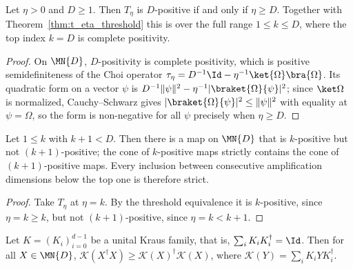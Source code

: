 \begin{theorem}
    \label{thm:t_eta_threshold_top}
    \leanok
    Let $\eta>0$ and $D\ge 1$. Then $T_\eta$ is $D$-positive if and only if
    $\eta\ge D$.
    Together with Theorem~\ref{thm:t_eta_threshold} this is
    \cite[Equation~(3.11)]{Wolf2012Quantum} over the full range $1\le k\le D$,
    where the top index $k=D$ is complete positivity.
\end{theorem}

\begin{proof}
    \leanok
    On $\MN{D}$, $D$-positivity is complete positivity, which is
    positive semidefiniteness of the Choi operator
    $\tau_\eta=D^{-1}\Id-\eta^{-1}\ket{\Omega}\bra{\Omega}$. Its quadratic form on
    a vector $\psi$ is $D^{-1}\|\psi\|^2-\eta^{-1}|\braket{\Omega}{\psi}|^2$; since
    $\ket\Omega$ is normalized, Cauchy--Schwarz gives
    $|\braket{\Omega}{\psi}|^2\le\|\psi\|^2$ with equality at $\psi=\Omega$, so the
    form is non-negative for all $\psi$ precisely when $\eta\ge D$.
\end{proof}

\begin{corollary}
    \label{cor:positivity_chain_strict}
    \leanok
    Let $1\le k$ with $k+1<D$. Then there is a map on $\MN{D}$ that is
    $k$-positive but not $(k+1)$-positive; the cone of $k$-positive maps strictly
    contains the cone of $(k+1)$-positive maps. Every inclusion between
    consecutive amplification dimensions below the top one is therefore strict.
\end{corollary}

\begin{proof}
    \leanok
    Take $T_\eta$ at $\eta=k$. By the threshold equivalence it is $k$-positive,
    since $\eta=k\ge k$, but not $(k+1)$-positive, since $\eta=k<k+1$.
\end{proof}

\begin{theorem}
    \leanok
    Let $K=(K_i)_{i=0}^{d-1}$ be a unital Kraus family, that is,
    $\sum_i K_i K_i^\dagger=\Id$. Then for all $X\in\MN{D}$,
    $\mathcal{K}(X^\dagger X)\ge
        \mathcal{K}(X)^\dagger\mathcal{K}(X)$,
    where $\mathcal{K}(Y)=\sum_i K_i Y K_i^\dagger$.
\end{theorem}

